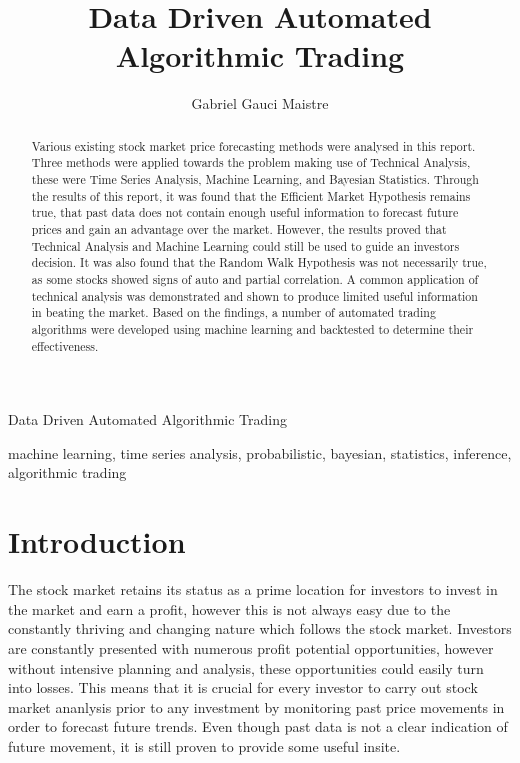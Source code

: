 \documentclass[times]{jtitauth}
\begin{document}
\title{Data Driven Automated Algorithmic Trading}

\author{Gabriel Gauci Maistre}

{Data Driven Automated Algorithmic Trading}

\maketitle

\begin{abstract}
Various existing stock market price forecasting methods were analysed in this report. Three methods were applied towards the problem making use of Technical Analysis, these were Time Series Analysis, Machine Learning, and Bayesian Statistics. Through the results of this report, it was found that the Efficient Market Hypothesis remains true, that past data does not contain enough useful information to forecast future prices and gain an advantage over the market. However, the results proved that Technical Analysis and Machine Learning could still be used to guide an investors decision. It was also found that the Random Walk Hypothesis was not necessarily true, as some stocks showed signs of auto and partial correlation. A common application of technical analysis was demonstrated and shown to produce limited useful information in beating the market. Based on the findings, a number of automated trading algorithms were developed using machine learning and backtested to determine their effectiveness.
\end {abstract}

\begin{keywords}
machine learning, time series analysis,
probabilistic, bayesian, statistics,
inference, algorithmic trading\
\end{keywords}

\section{Introduction}

The stock market retains its status as a prime location for investors to invest in the market and earn a profit, however this is not always easy due to the constantly thriving and changing nature which follows the stock market. Investors are constantly presented with numerous profit potential opportunities, however without intensive planning and analysis, these opportunities could easily turn into losses. This means that it is crucial for every investor to carry out stock market ananlysis prior to any investment by monitoring past price movements in order to forecast future trends. Even though past data is not a clear indication of future movement, it is still proven to provide some useful insite.
\end{document}
